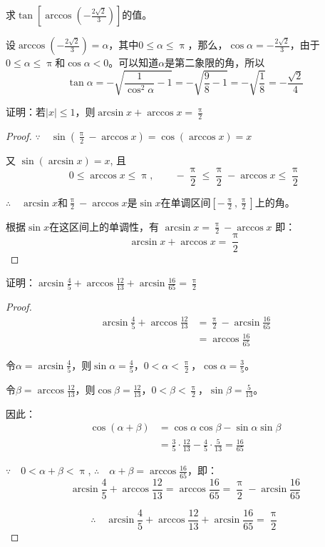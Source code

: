 \begin{example}
求$\tan\left[\arccos\left(-\frac{2\sqrt{2}}{3}\right)\right]$的值。
\end{example}

\begin{solution}
设$\arccos\left(-\frac{2\sqrt{2}}{3}\right)=\alpha$，其中$0\leqslant \alpha\leqslant \uppi$，那么，$\cos\alpha=-\frac{2\sqrt{2}}{3}$，由于$0\le\alpha\leqslant \uppi$和$\cos\alpha<0$。可以知道$\alpha$是第二象限的角，所以
\[\tan\alpha=-\sqrt{\frac{1}{\cos^2\alpha}-1}=-\sqrt{\frac{9}{8}-1}=-\sqrt{\frac{1}{8}}=-\frac{\sqrt{2}}{4}\]
\end{solution}


\begin{example}
证明：若$|x|\leqslant 1$，则$\arcsin x+\arccos x=\frac{\uppi}{2}$

\end{example}

\begin{proof}
 $\because\quad    \sin\left(\frac{\uppi}{2}-\arccos x\right)=\cos(\arccos x)=x$

    又    $\sin(\arcsin x)=x$, 且
  \[  0\leqslant \arccos x\leqslant \uppi,\qquad -\frac{\uppi}{2}\leqslant \frac{\uppi}{2}-\arccos x\leqslant \frac{\uppi}{2}\]

$\therefore\quad \arcsin x$和$\frac{\uppi}{2}-\arccos x$是$\sin x$在单调区间$\left[-\frac{\uppi}{2},\frac{\uppi}{2}\right]$上的角。

根据$\sin x$在这区间上的单调性，有
$\arcsin x=\frac{\uppi}{2}-\arccos x$
即：
\[\arcsin x+\arccos x=\frac{\uppi}{2}\]
\end{proof}

\begin{example}
证明：$\arcsin\frac{4}{5}+\arccos\frac{12}{13}+\arcsin\frac{16}{65}=\frac{\uppi}{2}$
\end{example}

\begin{proof}
\[\begin{split}
    \arcsin\frac{4}{5}+\arccos\frac{12}{13}&=\frac{\uppi}{2}-\arcsin\frac{16}{65}\\
&=\arccos\frac{16}{65}
\end{split}\]
    
令$\alpha=\arcsin\frac{4}{5}$，则$\sin\alpha=\frac{4}{5}$，$0<\alpha<\frac{\uppi}{2}$，$\cos\alpha=\frac{3}{5}$。

令$\beta=\arccos\frac{12}{13}$，则$\cos\beta=\frac{12}{13}$，$0<\beta<\frac{\uppi}{2}$，$\sin\beta=\frac{5}{13}$。

因此：\[\begin{split}
    \cos(\alpha+\beta)&=\cos\alpha\cos\beta-\sin\alpha\sin\beta\\
    &=\frac{3}{5}\cdot \frac{12}{13}-\frac{4}{5}\cdot \frac{5}{13}=\frac{16}{65}
\end{split}\]

$\because\quad 0<\alpha+\beta<\uppi$, $\therefore\quad \alpha+\beta=\arccos\frac{16}{65}$，即：
\[\arcsin\frac{4}{5}+\arccos\frac{12}{13}=\arccos\frac{16}{65}=\frac{\uppi}{2}-\arcsin\frac{16}{65}\]

\[\therefore\quad \arcsin\frac{4}{5}+\arccos\frac{12}{13}+\arcsin\frac{16}{65}=\frac{\uppi}{2}\]
\end{proof}

